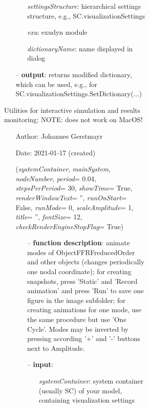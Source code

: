 \begin{itemize}[leftmargin=1.4cm]
\begin{itemize}[leftmargin=1.4cm]
\begin{itemize}[leftmargin=0.5cm]
\begin{itemize}[leftmargin=1.4cm]
\begin{itemize}[leftmargin=1.4cm]
\begin{itemize}[leftmargin=0.5cm]
\begin{itemize}[leftmargin=1.4cm]
\begin{itemize}[leftmargin=0.5cm]
\begin{itemize}[leftmargin=1.4cm]
\begin{itemize}[leftmargin=0.7cm]
\begin{itemize}[leftmargin=1.2cm]
\setlength{\itemindent}{-0.7cm}
\item[]{\it settingsStructure}: hierarchical settings structure, e.g., SC.visualizationSettings
\item[]{\it exu}: exudyn module
\item[]{\it dictionaryName}: name displayed in dialog
\end{itemize}
\item[--]
{\bf output}: returns modified dictionary, which can be used, e.g., for SC.visualizationSettings.SetDictionary(...)
\vspace{12pt}\end{itemize}
%
\label{sec:module:interactive}
  Utilities for interactive simulation and results monitoring; NOTE: does not work on MacOS!
\begin{itemize}[leftmargin=1.4cm]
\setlength{\itemindent}{-1.4cm}
\item[]Author:    Johannes Gerstmayr
\item[]Date:      2021-01-17 (created)
\ei
\begin{flushleft}
\label{sec:interactive:AnimateModes}
({\it systemContainer}, {\it mainSystem}, {\it nodeNumber}, {\it period}= 0.04, {\it stepsPerPeriod}= 30, {\it showTime}= True, {\it renderWindowText}= '', {\it runOnStart}= False, {\it runMode}= 0, {\it scaleAmplitude}= 1, {\it title}= '', {\it fontSize}= 12, {\it checkRenderEngineStopFlag}= True)
\end{flushleft}
\setlength{\itemindent}{0.7cm}
\begin{itemize}[leftmargin=0.7cm]
\item[--]
{\bf function description}: animate modes of ObjectFFRFreducedOrder and other objects (changes periodically one nodal coordinate); for creating snapshots, press 'Static' and 'Record animation' and press 'Run' to save one figure in the image subfolder; for creating animations for one mode, use the same procedure but use 'One Cycle'. Modes may be inverted by pressing according '+' and '-' buttons next to Amplitude.
\item[--]
{\bf input}: \vspace{-6pt}
\begin{itemize}[leftmargin=1.2cm]
\setlength{\itemindent}{-0.7cm}
\item[]{\it systemContainer}: system container (usually SC) of your model, containing visualization settings

\end{itemize}
\end{itemize}
\end{itemize}
\end{itemize}
\end{itemize}
\end{itemize}
\end{itemize}
\end{itemize}
\end{itemize}
\end{itemize}
\end{itemize}
\end{itemize}
